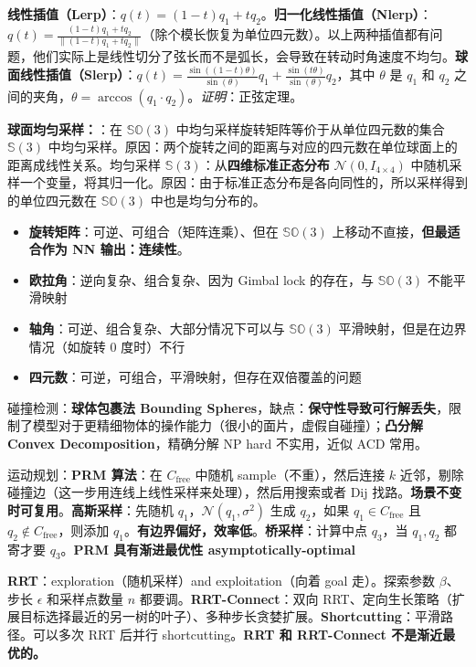 \documentclass[
  8pt]{extarticle}
\providecommand{\tightlist}{%
  \setlength{\itemsep}{0pt}\setlength{\parskip}{0pt}}
\begin{document}
\begin{multicols*}{4}
\textbf{线性插值（Lerp）}：\(q(t) = (1-t)q_1 + tq_2\)。\textbf{归一化线性插值（Nlerp）}：\(q(t) = \frac{(1-t)q_1 + tq_2}{\|(1-t)q_1 + tq_2\|}\)（除个模长恢复为单位四元数）。以上两种插值都有问题，他们实际上是线性切分了弦长而不是弧长，会导致在转动时角速度不均匀。\textbf{球面线性插值（Slerp）}：\(q(t) = \frac{\sin((1-t)\theta)}{\sin(\theta)} q_1 + \frac{\sin(t\theta)}{\sin(\theta)} q_2\)，其中
\(\theta\) 是 \(q_1\) 和 \(q_2\)
之间的夹角，\(\theta = \arccos(q_1 \cdot q_2)\)。\emph{证明}：正弦定理。

\textbf{球面均匀采样：}：在 \(\mathbb{SO}(3)\)
中均匀采样旋转矩阵等价于从单位四元数的集合 \(\mathbb{S}(3)\)
中均匀采样。原因：两个旋转之间的距离与对应的四元数在单位球面上的距离成线性关系。均匀采样
\(\mathbb{S}(3)\)：从\textbf{四维标准正态分布}
\(\mathcal{N}(0, I_{4 \times 4})\)
中随机采样一个变量，将其归一化。原因：由于标准正态分布是各向同性的，所以采样得到的单位四元数在
\(\mathbb{SO}(3)\) 中也是均匀分布的。

\begin{itemize}
\tightlist
\item
  \textbf{旋转矩阵}：可逆、可组合（矩阵连乘）、但在 \(\mathbb{SO}(3)\)
  上移动不直接，\textbf{但最适合作为 NN 输出：连续性}。
\item
  \textbf{欧拉角}：逆向复杂、组合复杂、因为 Gimbal lock 的存在，与
  \(\mathbb{SO}(3)\) 不能平滑映射
\item
  \textbf{轴角}：可逆、组合复杂、大部分情况下可以与 \(\mathbb{SO}(3)\)
  平滑映射，但是在边界情况（如旋转 \(0\) 度时）不行
\item
  \textbf{四元数}：可逆，可组合，平滑映射，但存在双倍覆盖的问题
\end{itemize}

碰撞检测：\textbf{球体包裹法 Bounding
Spheres}，缺点：\textbf{保守性导致可行解丢失}，限制了模型对于更精细物体的操作能力（很小的面片，虚假自碰撞）；\textbf{凸分解
Convex Decomposition}，精确分解 NP hard 不实用，近似 ACD 常用。

运动规划：\textbf{PRM 算法}：在 \(C_{\text{free}}\) 中随机
sample（不重），然后连接 \(k\)
近邻，剔除碰撞边（这一步用连线上线性采样来处理），然后用搜索或者 Dij
找路。\textbf{场景不变时可复用}。\textbf{高斯采样}：先随机
\(q_1\)，\(\mathcal N (q_1, \sigma^2)\) 生成 \(q_2\)，如果
\(q_1 \in C_{\text{free}}\) 且 \(q_2 \notin C_{\text{free}}\)，则添加
\(q_1\)。\textbf{有边界偏好，效率低}。\textbf{桥采样}：计算中点
\(q_3\)，当 \(q_1,q_2\) 都寄才要 \(q_3\)。\textbf{PRM 具有渐进最优性
asymptotically-optimal}

\textbf{RRT}：exploration（随机采样）and exploitation（向着 goal
走）。探索参数 \(\beta\)、步长 \(\epsilon\) 和采样点数量 \(n\)
都要调。\textbf{RRT-Connect}：双向
RRT、定向生长策略（扩展目标选择最近的另一树的叶子）、多种步长贪婪扩展。\textbf{Shortcutting}：平滑路径。可以多次
RRT 后并行 shortcutting。\textbf{RRT 和 RRT-Connect 不是渐近最优的。}


\end{multicols*}
\end{document}
